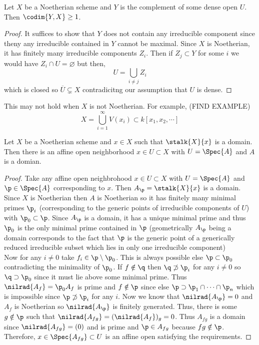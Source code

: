 \documentclass[12pt]{article}
\begin{document}
\begin{lemma}
Let $X$ be a Noetherian scheme and $Y$ is the complement of some dense open $U$. Then $\codim{Y, X} \ge 1$.
\end{lemma}

\begin{proof}
It suffices to show that $Y$ does not contain any irreducible component since theny any irreducible contained in $Y$ cannot be maximal. Since $X$ is Noetherian, it has finitely many irreducible components $Z_i$. Then if $Z_j \subset Y$ for some $i$ we would have $Z_i \cap U = \varnothing$ but then,
\[ U = \bigcup_{i \neq j} Z_i \]
which is closed so $\overline{U} \subsetneq X$ contradicitng our assumption that $U$ is dense.
\end{proof}

\begin{example}
This may not hold when $X$ is not Noetherian. For example, (FIND EXAMPLE)
\[ X = \bigcup_{i = 1}^\infty V(x_i) \subset k[x_1, x_2, \cdots] \] 
\end{example}

\begin{lemma} \label{open_domain}
Let $X$ be a Noetherian scheme and $x \in X$ such that $\stalk{X}{x}$ is a domain. Then there is an affine open neighborhood $x \in U \subset X$ with $U = \Spec{A}$ and $A$ is a domian.
\end{lemma}

\begin{proof}
Take any affine open neighbrohood $x \in U \subset X$ with $U = \Spec{A}$ and $\p \in \Spec{A}$ corresponding to $x$. Then $A_\p = \stalk{X}{x}$ is a domain. Since $X$ is Noetherian then $A$ is Noetherian so it has finitely many minimal primes $\p_i$ (corresponding to the generic points of irreducible components of $U$) with $\p_0 \subset \p$. Since $A_\p$ is a domain, it has a unique minimal prime and thus $\p_0$ is the only minimal prime contained in $\p$ (geometrically $A_\p$ being a domain corresponds to the fact that $\p$ is the generic point of a generically reduced irreducible subset which lies in only one irreducible component)
\bigskip\\
Now for any $i \neq 0$ take $f_i \in \p \setminus \p_0$. This is always possible else $\p \subset \p_0$ contradicting the minimality of $\p_0$. If $f \notin \q$ then $\q \not\supset \p_i$ for any $i \neq 0$ so $\q \supset \p_0$ since it must lie above some minimal prime. Thus $\nilrad{A_f} = \p_0 A_f$ is prime and $f \notin \p$ since else $\p \supset \p_1 \cap \cdots \cap \p_n$ which is impossible since $\p \not\supset \p_i$ for any $i$. Now we know that $\nilrad{A_\p} = 0$ and $A_f$ is Noetherian so $\nilrad{A_\p}$ is finitely generated. Thus, there is some $g \notin \p$ such that $\nilrad{A_{fg}} = (\nilrad{A_f})_g = 0$. Thus $A_{fg}$ is a domain since $\nilrad{A_{fg}} = (0)$ and is prime and $\p \in A_{fg}$ because $fg \notin \p$. Therefore, $x \in \Spec{A_{fg}} \subset U$ is an affine open satisfying the requirements. 
\end{proof}
\end{document}
